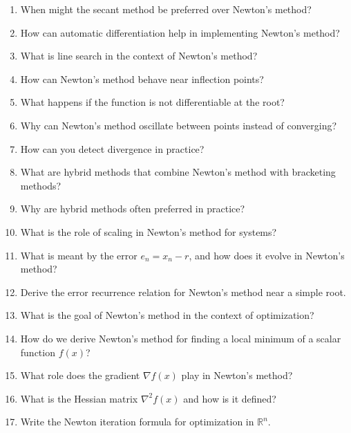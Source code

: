 \begin{enumerate}
\item When might the secant method be preferred over Newton's method?

\item How can automatic differentiation help in implementing Newton's method?

\item What is line search in the context of Newton's method?

\item How can Newton's method behave near inflection points?

\item What happens if the function is not differentiable at the root?

\item Why can Newton's method oscillate between points instead of converging?

\item How can you detect divergence in practice?

\item What are hybrid methods that combine Newton's method with bracketing methods?

\item Why are hybrid methods often preferred in practice?

\item What is the role of scaling in Newton's method for systems?

\item What is meant by the error $e_n = x_n - r$, and how does it evolve in Newton's method?

\item Derive the error recurrence relation for Newton's method near a simple root.

\item What is the goal of Newton's method in the context of optimization?

\item How do we derive Newton's method for finding a local minimum of a scalar function $f(x)$?

\item What role does the gradient $\nabla f(x)$ play in Newton's method?

\item What is the Hessian matrix $\nabla^2 f(x)$ and how is it defined?

\item Write the Newton iteration formula for optimization in $\mathbb{R}^n$.


\end{enumerate}
